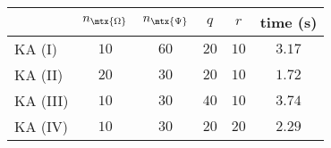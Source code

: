 \centering
\renewcommand{\arraystretch}{1.2}
\begin{tabular}{@{}lccccc@{}}
\toprule
 & $n_{\mtx{\Omega}}$ & $n_{\mtx{\Psi}}$ & $q$ & $r$ & time (s)\\
\midrule
KA (I) & $10$ & $60$ & $20$ & $10$ & $3.17$ \\
KA (II) & $20$ & $30$ & $20$ & $10$ & $1.72$ \\
KA (III) & $10$ & $30$ & $40$ & $10$ & $3.74$ \\
KA (IV) & $10$ & $30$ & $20$ & $20$ & $2.29$ \\
\bottomrule
\end{tabular}
